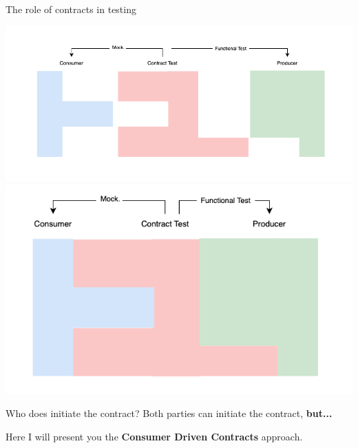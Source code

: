 \begin{frame}{The role of contracts in testing}
    \begin{center}
        \includegraphics[scale=.3]{./assets/contract_divided}
        \includegraphics[scale=.3]{./assets/contract_united}
    \end{center}
\end{frame}

\begin{frame}{Who does initiate the contract?}
    Both parties can initiate the contract, \textbf{but...}

    Here I will present you the \textbf{Consumer Driven Contracts} approach.
\end{frame}

